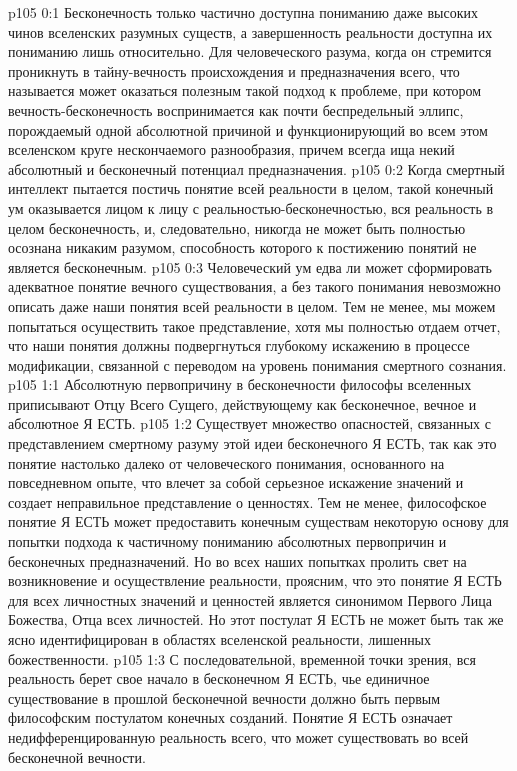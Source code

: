\author{Мелхиседек}
\vs p105 0:1 Бесконечность только частично доступна пониманию даже высоких чинов вселенских разумных существ, а завершенность реальности доступна их пониманию лишь относительно. Для человеческого разума, когда он стремится проникнуть в тайну\hyp{}вечность происхождения и предназначения всего, что называется  может оказаться полезным такой подход к проблеме, при котором вечность\hyp{}бесконечность воспринимается как почти беспредельный эллипс, порождаемый одной абсолютной причиной и функционирующий во всем этом вселенском круге нескончаемого разнообразия, причем всегда ища некий абсолютный и бесконечный потенциал предназначения.
\vs p105 0:2 Когда смертный интеллект пытается постичь понятие всей реальности в целом, такой конечный ум оказывается лицом к лицу с реальностью\hyp{}бесконечностью, вся реальность в целом  бесконечность, и, следовательно, никогда не может быть полностью осознана никаким разумом, способность которого к постижению понятий не является бесконечным.
\vs p105 0:3 Человеческий ум едва ли может сформировать адекватное понятие вечного существования, а без такого понимания невозможно описать даже наши понятия всей реальности в целом. Тем не менее, мы можем попытаться осуществить такое представление, хотя мы полностью отдаем отчет, что наши понятия должны подвергнуться глубокому искажению в процессе модификации, связанной с переводом на уровень понимания смертного сознания.
\vs p105 1:1 Абсолютную первопричину в бесконечности философы вселенных приписывают Отцу Всего Сущего, действующему как бесконечное, вечное и абсолютное Я ЕСТЬ.
\vs p105 1:2 Существует множество опасностей, связанных с представлением смертному разуму этой идеи бесконечного Я ЕСТЬ, так как это понятие настолько далеко от человеческого понимания, основанного на повседневном опыте, что влечет за собой серьезное искажение значений и создает неправильное представление о ценностях. Тем не менее, философское понятие Я ЕСТЬ может предоставить конечным существам некоторую основу для попытки подхода к частичному пониманию абсолютных первопричин и бесконечных предназначений. Но во всех наших попытках пролить свет на возникновение и осуществление реальности, проясним, что это понятие Я ЕСТЬ для всех личностных значений и ценностей является синонимом Первого Лица Божества, Отца всех личностей. Но этот постулат Я ЕСТЬ не может быть так же ясно идентифицирован в областях вселенской реальности, лишенных божественности.
\vs p105 1:3 \pc {} С последовательной, временной точки зрения, вся реальность берет свое начало в бесконечном Я ЕСТЬ, чье единичное существование в прошлой бесконечной вечности должно быть первым философским постулатом конечных созданий. Понятие Я ЕСТЬ означает  недифференцированную реальность всего, что может существовать во всей бесконечной вечности.
